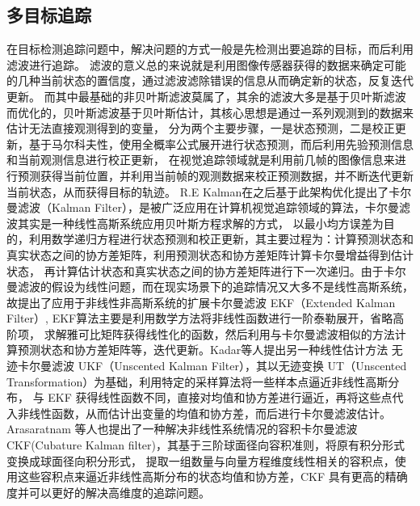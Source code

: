 \subsection{多目标追踪}
在目标检测追踪问题中，解决问题的方式一般是先检测出要追踪的目标，而后利用滤波进行追踪。
滤波的意义总的来说就是利用图像传感器获得的数据来确定可能的几种当前状态的置信度，通过滤波滤除错误的信息从而确定新的状态，反复迭代更新。
而其中最基础的非贝叶斯滤波莫属了，其余的滤波大多是基于贝叶斯滤波而优化的，贝叶斯滤波基于贝叶斯估计，其核心思想是通过一系列观测到的数据来估计无法直接观测得到的变量，
分为两个主要步骤，一是状态预测，二是校正更新，基于马尔科夫性，使用全概率公式展开进行状态预测，而后利用先验预测信息和当前观测信息进行校正更新，
在视觉追踪领域就是利用前几帧的图像信息来进行预测获得当前位置，并利用当前帧的观测数据来校正预测数据，并不断迭代更新当前状态，从而获得目标的轨迹。
R.E Kalman在之后基于此架构优化提出了卡尔曼滤波（Kalman Filter）\cite{44}，是被广泛应用在计算机视觉追踪领域的算法，卡尔曼滤波其实是一种线性高斯系统应用贝叶斯方程求解的方式，
以最小均方误差为目的，利用数学递归方程进行状态预测和校正更新，其主要过程为：计算预测状态和真实状态之间的协方差矩阵，利用预测状态和协方差矩阵计算卡尔曼增益得到估计状态，
再计算估计状态和真实状态之间的协方差矩阵进行下一次递归\cite{45}。由于卡尔曼滤波的假设为线性问题，而在现实场景下的追踪情况又大多不是线性高斯系统，
故提出了应用于非线性非高斯系统的扩展卡尔曼滤波 EKF（Extended Kalman Filter）\cite{46}, EKF算法\cite{47}主要是利用数学方法将非线性函数进行一阶泰勒展开，省略高阶项，
求解雅可比矩阵获得线性化的函数，然后利用与卡尔曼滤波相似的方法计算预测状态和协方差矩阵等，迭代更新。Kadar等人\cite{48}提出另一种线性估计方法
无迹卡尔曼滤波 UKF（Unscented Kalman Filter），其以无迹变换 UT（Unscented Transformation）为基础，利用特定的采样算法将一些样本点逼近非线性高斯分布，
与 EKF 获得线性函数不同，直接对均值和协方差进行逼近，再将这些点代入非线性函数，从而估计出变量的均值和协方差，而后进行卡尔曼滤波估计。
Arasaratnam 等人\cite{49}也提出了一种解决非线性系统情况的容积卡尔曼滤波 CKF(Cubature Kalman filter)，其基于三阶球面径向容积准则，将原有积分形式变换成球面径向积分形式，
提取一组数量与向量方程维度线性相关的容积点，使用这些容积点来逼近非线性高斯分布的状态均值和协方差，CKF 具有更高的精确度并可以更好的解决高维度的追踪问题。

